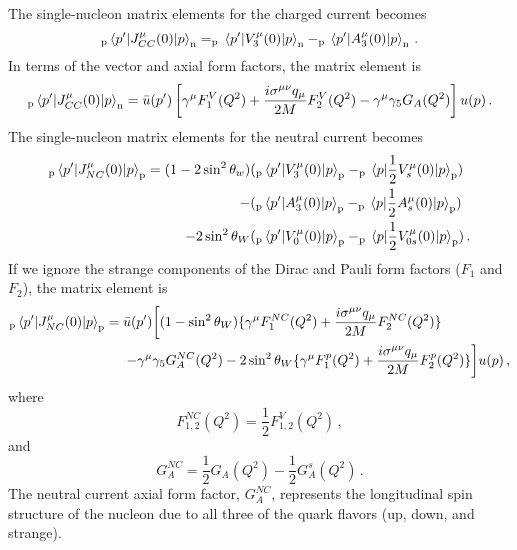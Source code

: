   The single-nucleon matrix elements for the charged current becomes
  \begin{equation}
     _{\textrm{p}}\mel{p'}{J^{\mu}_{CC}(0)}{p}_{\textrm{n}} 
       = _{\textrm{p}}\mel{p'}{V^{\mu}_3(0)}{p}_{\textrm{n}}
       - _{\textrm{p}}\mel{p'}{A^{\mu}_3(0)}{p}_{\textrm{n}} \,.
  \end{equation}
  In terms of the vector and axial form factors, the matrix element is
  \begin{equation}
     _{\textrm{p}}\mel{p'}{J^{\mu}_{CC}(0)}{p}_{\textrm{n}}
       = \bar{u}(p')\left[\gamma^{\mu} F_1^V(Q^2)
          + \frac{i\sigma^{\mu\nu}q_{\mu}}{2M} F_2^V(Q^2)
          - \gamma^{\mu}\gamma_5G_A(Q^2) \right] u(p) \,.
  \end{equation}
  The single-nucleon matrix elements for the neutral current becomes
  \begin{equation}
    \begin{aligned}
      _{\textrm{p}}\mel{p'}{J^{\mu}_{NC}(0)}{p}_{\textrm{p}} 
       = (1-2\sin^2\theta_w)&(_{\textrm{p}}\mel{p'}{V^{\mu}_3(0)}{p}_{\textrm{p}}
        - _{\textrm{p}}\mel{p}{\frac{1}{2}V^{\mu}_s(0)}{p}_{\textrm{p}}) \\
       - &(_{\textrm{p}}\mel{p'}{A^{\mu}_3(0)}{p}_{\textrm{p}}
        - _{\textrm{p}}\mel{p}{\frac{1}{2}A^{\mu}_s(0)}{p}_{\textrm{p}}) \\
       - 2\sin^2\theta_W&(_{\textrm{p}}\mel{p'}{V^{\mu}_0(0)}{p}_{\textrm{p}}
        - _{\textrm{p}}\mel{p}{\frac{1}{2}V^{\mu}_{0s}(0)}{p}_{\textrm{p}}) \,.
    \end{aligned}
  \end{equation}
  If we ignore the strange components of the Dirac and Pauli form factors
  ($F_1$ and $F_2$), the matrix element is
  \begin{equation}\label{eq:nucmatel}
    \begin{aligned}
     _{\textrm{p}}\mel{p'}{J^{\mu}_{NC}(0)}{p}_{\textrm{p}}
       = \bar{u}(p')&\bigg[(1-\sin^2\theta_W)\{\gamma^{\mu}F_1^{NC}(Q^2)
          + \frac{i\sigma^{\mu\nu}q_{\mu}}{2M}F_2^{NC}(Q^2)\}  \\
          - \gamma^{\mu}&\gamma_5 G_A^{NC}(Q^2)
          - 2\sin^2\theta_W\{\gamma^{\mu}F_1^p(Q^2) 
          + \frac{i\sigma^{\mu\nu}q_{\mu}}{2M}F_2^p(Q^2)\} \bigg]u(p) \,,
    \end{aligned}
  \end{equation}
  where
  \begin{equation}
    F_{1,2}^{NC}(Q^2) = \frac{1}{2}F_{1,2}^V(Q^2) \,,
  \end{equation}
  and
  \begin{equation}
    G_A^{NC} = \frac{1}{2}G_A(Q^2) - \frac{1}{2}G_A^s(Q^2) \,.
  \end{equation}
  The neutral current axial form factor, $G_A^{NC}$, represents the
  longitudinal spin structure of the nucleon due to all three of the quark
  flavors (up, down, and strange).
  

